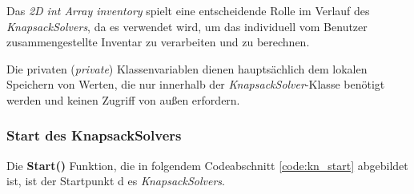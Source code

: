 Das \textit{2D int Array inventory} spielt eine entscheidende Rolle im Verlauf des \textit{KnapsackSolvers}, da es verwendet
wird, um das individuell vom Benutzer zusammengestellte Inventar zu verarbeiten und zu berechnen.

Die privaten (\textit{private}) Klassenvariablen dienen hauptsächlich dem lokalen Speichern von Werten, die nur innerhalb
der \textit{KnapsackSolver}-Klasse benötigt werden und keinen Zugriff von außen erfordern.

\subsubsection{Start des KnapsackSolvers}
Die \textbf{Start()} Funktion, die in folgendem Codeabschnitt \ref{code:kn_start} abgebildet ist, ist der Startpunkt d
es \textit{KnapsackSolvers}.

